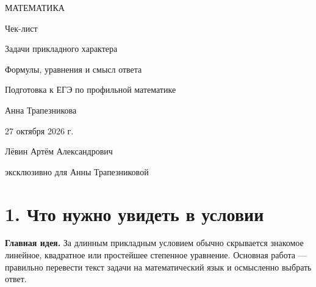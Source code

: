 \documentclass[a4paper,12pt]{article}
\newcommand{\key}[1]{\textcolor{accent}{\textbf{#1}}}
\begin{document}
\thispagestyle{empty}
\begin{center}
\vspace*{29mm}
{\large\textcolor{accent}{МАТЕМАТИКА}}\par
\vspace{20mm}
{\Huge\mdseries Чек-лист}\par
\vspace{14mm}
{\LARGE\textcolor{accent}{Задачи прикладного характера}}\par
\vspace{4mm}
{\Large\textcolor{accent}{Формулы, уравнения и смысл ответа}}\par
\vspace{18mm}
{\normalsize Подготовка к ЕГЭ по профильной математике}\par
\vfill
{\large Анна Трапезникова}\par
\vspace{8mm}
{27 октября 2026 г.}\par
\vspace{15mm}
{\small Лёвин Артём Александрович}\par
{\small эксклюзивно для Анны Трапезниковой}\par
\vspace{14mm}
\vspace*{8mm}
\end{center}
\clearpage

\section*{1. Что нужно увидеть в условии}
\key{Главная идея.} За длинным прикладным условием обычно скрывается знакомое линейное, квадратное или простейшее степенное уравнение. Основная работа --- правильно перевести текст задачи на математический язык и осмысленно выбрать ответ.
\end{document}
